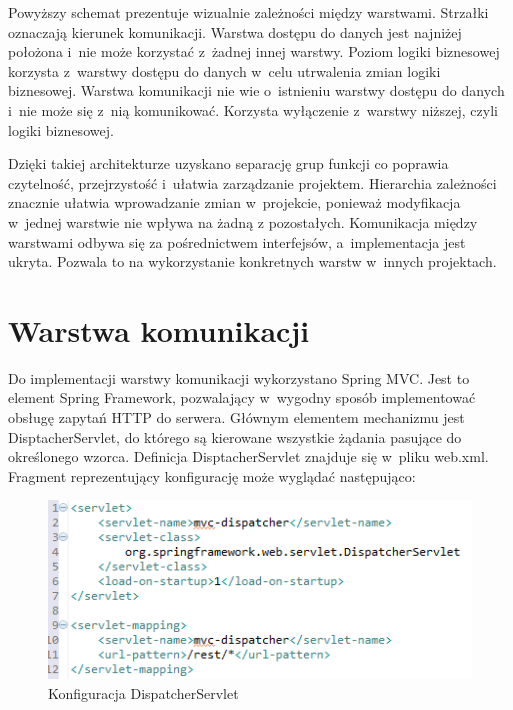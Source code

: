 Powyższy schemat prezentuje wizualnie zależności między warstwami. Strzałki oznaczają kierunek komunikacji. Warstwa dostępu do danych jest najniżej położona i~nie może korzystać z~żadnej innej warstwy. Poziom logiki biznesowej korzysta z~warstwy dostępu do danych w~celu utrwalenia zmian logiki biznesowej. Warstwa komunikacji nie wie o~istnieniu warstwy dostępu do danych i~nie może się z~nią komunikować. Korzysta wyłączenie z~warstwy niższej, czyli logiki biznesowej.

Dzięki takiej architekturze uzyskano separację grup funkcji co poprawia czytelność, przejrzystość i~ułatwia zarządzanie projektem. Hierarchia zależności znacznie ułatwia wprowadzanie zmian w~projekcie, ponieważ modyfikacja w~jednej warstwie nie wpływa na żadną z pozostałych. Komunikacja między warstwami odbywa się za pośrednictwem interfejsów, a~implementacja jest ukryta. Pozwala to na wykorzystanie konkretnych warstw w~innych projektach.


\section{Warstwa komunikacji}

Do implementacji warstwy komunikacji wykorzystano Spring MVC. Jest to element Spring Framework, pozwalający w~wygodny sposób implementować obsługę zapytań HTTP do serwera. Głównym elementem mechanizmu jest DisptacherServlet, do którego są kierowane wszystkie żądania pasujące do określonego wzorca. Definicja DisptacherServlet znajduje się w~pliku web.xml. Fragment reprezentujący konfigurację może wyglądać następująco:

\begin{figure}[H]
	\centering
	\includegraphics[width=\textwidth]{images/dispatcher.png}
	\caption{Konfiguracja DispatcherServlet}
\end{figure}

